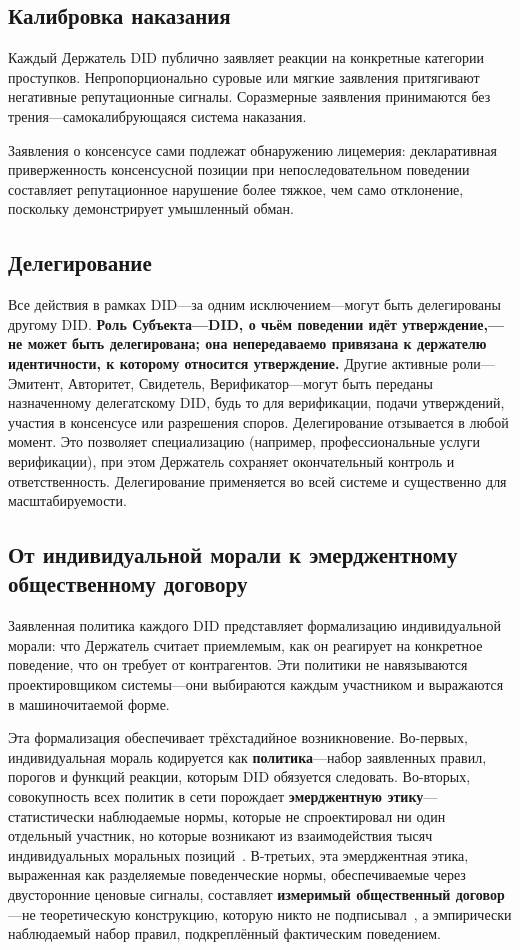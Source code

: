 \documentclass[11pt,a4paper,twocolumn]{article}
\begin{document}
\subsection{Калибровка наказания}

Каждый Держатель DID публично заявляет реакции на конкретные категории проступков. Непропорционально суровые или мягкие заявления притягивают негативные репутационные сигналы. Соразмерные заявления принимаются без трения---самокалибрующаяся система наказания.

Заявления о консенсусе сами подлежат обнаружению лицемерия: декларативная приверженность консенсусной позиции при непоследовательном поведении составляет репутационное нарушение более тяжкое, чем само отклонение, поскольку демонстрирует умышленный обман.

\subsection{Делегирование}

Все действия в рамках DID---за одним исключением---могут быть делегированы другому DID. \textbf{Роль Субъекта---DID, о чьём поведении идёт утверждение,---не может быть делегирована; она непередаваемо привязана к держателю идентичности, к которому относится утверждение.} Другие активные роли---Эмитент, Авторитет, Свидетель, Верификатор---могут быть переданы назначенному делегатскому DID, будь то для верификации, подачи утверждений, участия в консенсусе или разрешения споров. Делегирование отзывается в любой момент. Это позволяет специализацию (например, профессиональные услуги верификации), при этом Держатель сохраняет окончательный контроль и ответственность. Делегирование применяется во всей системе и существенно для масштабируемости.

\subsection{От индивидуальной морали к эмерджентному общественному договору}

Заявленная политика каждого DID представляет формализацию индивидуальной морали: что Держатель считает приемлемым, как он реагирует на конкретное поведение, что он требует от контрагентов. Эти политики не навязываются проектировщиком системы---они выбираются каждым участником и выражаются в машиночитаемой форме.

Эта формализация обеспечивает трёхстадийное возникновение. Во-первых, индивидуальная мораль кодируется как \textbf{политика}---набор заявленных правил, порогов и функций реакции, которым DID обязуется следовать. Во-вторых, совокупность всех политик в сети порождает \textbf{эмерджентную этику}---статистически наблюдаемые нормы, которые не спроектировал ни один отдельный участник, но которые возникают из взаимодействия тысяч индивидуальных моральных позиций~\cite{durkheim1893}. В-третьих, эта эмерджентная этика, выраженная как разделяемые поведенческие нормы, обеспечиваемые через двусторонние ценовые сигналы, составляет \textbf{измеримый общественный договор}---не теоретическую конструкцию, которую никто не подписывал~\cite{rawls1971}, а эмпирически наблюдаемый набор правил, подкреплённый фактическим поведением.
\end{document}
